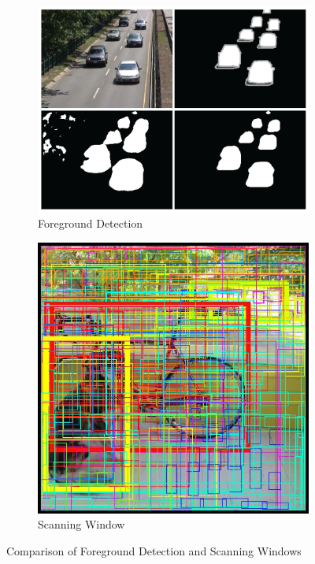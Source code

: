 \begin{figure}[ht]
	\begin{subfigure}[b]{.5\textwidth}
		\centering
		\includegraphics[width=.9\linewidth]{img/chapter2_background/robustBackgroundSubtraction.png}
		\caption{Foreground Detection \cite{Zeng2017}}
	\end{subfigure}%
	\hspace{\fill} 
	\begin{subfigure}[b]{.5\textwidth}
		\centering
		\includegraphics[width=.675\linewidth]{img/chapter2_background/yoloBBBoxes.png}
		\caption{Scanning Window \cite{Redmon}}
	\end{subfigure}
	
	\begin{center}
		\caption{Comparison of Foreground Detection and Scanning Windows}
		\label{fig:foregroundVsScanning}
	\end{center}
\end{figure}

